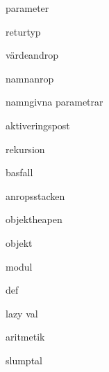 \item parameter
\item returtyp
\item värdeandrop
\item namnanrop
\item namngivna parametrar
\item aktiveringspost
\item rekursion
\item basfall
\item anropsstacken
\item objektheapen
\item objekt
\item modul
\item def
\item lazy val
\item aritmetik
\item slumptal